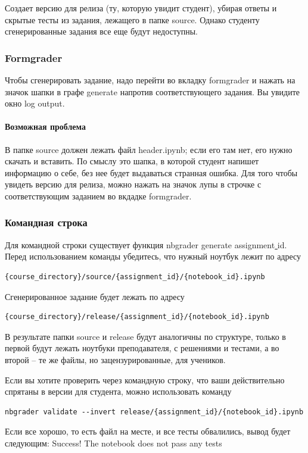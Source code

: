 \documentclass[a4paper,12pt]{article}
\begin{document}
Создает версию для релиза (ту, которую увидит студент), убирая ответы и скрытые тесты из задания, лежащего в папке source. Однако студенту сгенерированные задания все еще будут недоступны.

\subsubsection{Formgrader}

Чтобы сгенерировать задание, надо перейти во вкладку formgrader и нажать на значок шапки в графе generate напротив соответствующего задания. Вы увидите окно log output.
\paragraph{Возможная проблема}
В папке source должен лежать файл header.ipynb; если его там нет, его нужно скачать и вставить. По смыслу это шапка, в которой студент напишет информацию о себе, без нее будет выдаваться странная ошибка.
Для того чтобы увидеть версию для релиза, можно нажать на значок лупы в строчке с соответствующим заданием во вкдадке formgrader.
\subsubsection{Командная строка}

Для командной строки существует функция nbgrader generate assignment\underline{ }id.
Перед использованием команды убедитесь, что нужный ноутбук лежит по адресу 
\begin{verbatim}
{course_directory}/source/{assignment_id}/{notebook_id}.ipynb
\end{verbatim}
Сгенерированное задание будет лежать по адресу
\begin{verbatim}
{course_directory}/release/{assignment_id}/{notebook_id}.ipynb
\end{verbatim}
В результате папки source и release будут аналогичны по структуре, только в первой будут лежать ноутбуки преподавателя, с решениями и тестами, а во второй -- те же файлы, но зацензурированные, для учеников.

Если вы хотите проверить через командную строку, что ваши действительно спрятаны в версии для студента, можно использовать команду
\begin{verbatim}
nbgrader validate --invert release/{assignment_id}/{notebook_id}.ipynb
\end{verbatim}
Если все хорошо, то есть файл на месте, и все тесты обвалились, вывод будет следующим:
\grqq Success! The notebook does not pass any tests\grqq
\end{document}
